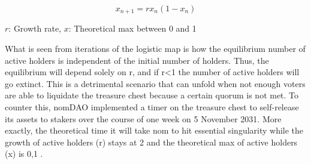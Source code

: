 \documentclass[12pt]{article}
\begin{document}
\begin{equation}\label{mm}
x_{n+1} =rx_{n}(1-x_{n})
\end{equation}\label{mm}

$r$: Growth rate, $x$: Theoretical max between 0 and 1

What is seen from iterations of the logistic map is how the equilibrium number of active holders is independent of the initial number of holders. Thus, the equilibrium will depend solely on r, and if r<1 the number of active holders will go extinct. This is a detrimental scenario that can unfold when not enough voters are able to liquidate the treasure chest because a certain quorum is not met. To counter this, nomDAO implemented a timer on the treasure chest to self-release its assets to stakers over the course of one week on 5 November 2031. More exactly, the theoretical time it will take nom to hit essential singularity while the growth of active holders (r) stays at 2 and the theoretical max of active holders (x) is 0,1 \textperthousand.
\end{document}
